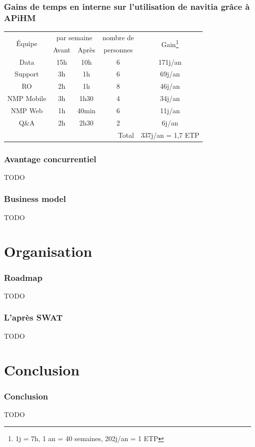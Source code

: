 \documentclass[table]{beamer}
\begin{document}
\begin{frame}
  \frametitle{Gains de temps en interne sur l'utilisation de navitia
    grâce à APiHM}

  \centering

  \begin{tabular}{|c|c|c|c|c|}
    \hline
    \multirow{2}{*}{Équipe}& \multicolumn{2}{c|}{par
      semaine}&nombre de&\multirow{2}{*}{Gain\footnote{1j = 7h,
        1 an = 40 semaines, 202j/an = 1 ETP}}\\
    \hhline{~--~~}
    & Avant & Après & personnes &\\
    \hline
    Data       &15h &10h & 6 & 171j/an\\
    Support    & 3h & 1h & 6 &  69j/an\\
    RO         & 2h & 1h & 8 &  46j/an\\
    NMP Mobile & 3h &1h30& 4 &  34j/an\\
    NMP Web    & 1h &40min&6 &  11j/an\\
    Q\&A       & 2h &2h30& 2 &   6j/an\\
    \hline
    \multicolumn{4}{|r|}{Total} &
    337j/an = 1{,}7 ETP\\
    \hline
  \end{tabular}
\end{frame}

\begin{frame}
  \frametitle{Avantage concurrentiel}

  TODO
\end{frame}

\begin{frame}
  \frametitle{Business model}

  TODO
\end{frame}

\section{Organisation}

\begin{frame}
  \frametitle{Roadmap}

  TODO
\end{frame}

\begin{frame}
  \frametitle{L'après SWAT}

  TODO
\end{frame}

\section{Conclusion}

\begin{frame}
  \frametitle{Conclusion}

  TODO
\end{frame}
\end{document}

